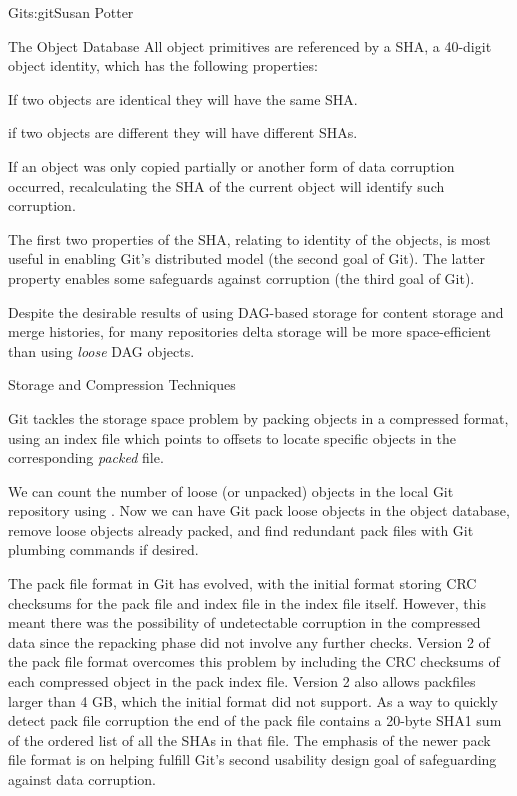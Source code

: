 \begin{aosachapter}{Git}{s:git}{Susan Potter}
\begin{aosasect1}{The Object Database}
\noindent All object primitives are referenced by a SHA, a 40-digit object identity,
which has the following properties:
\begin{aosaitemize}
  \item If two objects are identical they will have the same SHA.
  \item if two objects are different they will have different SHAs.
  \item If an object was only copied partially or another form of data
        corruption occurred, recalculating the SHA of the current object
        will identify such corruption.
\end{aosaitemize}

The first two properties of the SHA, relating to identity of the objects, is
most useful in enabling Git's distributed model (the second goal of Git).
The latter property enables some safeguards against corruption (the third
goal of Git).

Despite the desirable results of using DAG-based storage for content
storage and merge histories, for many repositories delta storage will be
more space-efficient than using \emph{loose} DAG objects.

\end{aosasect1}

\begin{aosasect1}{Storage and Compression Techniques}

Git tackles the storage space problem by packing objects in a compressed
format, using an index file which points to offsets to locate specific objects in the
corresponding \emph{packed} file.


We can count the number of loose (or unpacked) objects in the local
Git repository using . Now we can have Git pack
loose objects in the object database, remove loose objects already
packed, and find redundant pack files with Git plumbing commands if desired.

The pack file format in Git has evolved, with the initial format storing
CRC checksums for the pack file and index file in the index file
itself. However, this meant there was the possibility of undetectable
corruption in the compressed data since the repacking phase did not involve any
further checks. Version 2 of the pack file format overcomes this problem by
including the CRC checksums of each compressed object in the pack index
file. Version 2 also allows packfiles larger than 4 GB, which the initial
format did not support. As a way to quickly detect pack file corruption the
end of the pack file contains a 20-byte SHA1 sum of the ordered list of all
the SHAs in that file.  
The emphasis of the newer pack file format is on helping fulfill Git's second
usability design goal of safeguarding against data corruption.


\end{aosasect1}
\end{aosachapter}
